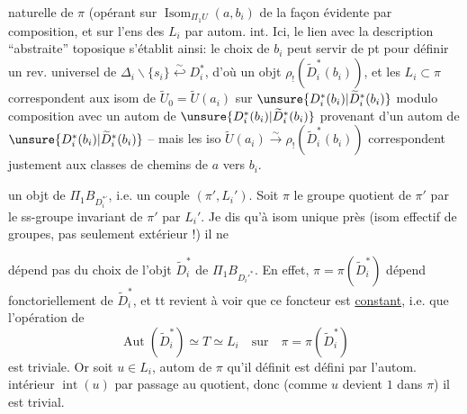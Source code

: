 naturelle de \(\pi\) (opérant sur \(\operatorname{Isom}_{\Pi_1U}(a,b_i)\) de la façon évidente par composition, et sur l'ens des \(L_i\) par autom. int.
 Ici, le  lien avec la description ``abstraite'' toposique s'établit ainsi: le choix de \(b_i\) peut servir de pt  pour définir un rev. universel de \(\Delta_i\smallsetminus\{s_i\}\overset{\sim}{\hookleftarrow}D_i^*\), d'où un objt \(\rho_!(\widetilde D_i^*(b_i))\), et  les \(L_i\subset\pi\) correspondent  aux isom de \(\widetilde U_0=\widetilde U(a_i)\) sur \(\unsure{D_i^*(b_i)|\widetilde D_i^*(b_i)}\) modulo composition avec un autom de \(\unsure{D_i^*(b_i)|\widetilde D_i^*(b_i)}\) provenant d'un autom de \(\unsure{D_i^*(b_i)|\widetilde D_i^*(b_i)}\) -- mais les iso  \(\widetilde U(a_i)\xrightarrow{\sim}\rho_!(\widetilde D_i^*(b_i))\) correspondent justement aux classes de chemins de \(a\) vers \(b_i\).

 un objt de \(\Pi_1B_{D_i^{*'}}\), i.e. un couple \((\pi',L_i')\). Soit \(\pi\) le groupe quotient de \(\pi'\) par le ss-groupe invariant de \(\pi'\)   par \(L_i'\). Je dis \margin{\(\Vert\)} qu'à isom unique près (isom effectif de groupes, pas seulement extérieur !) il ne

dépend pas du choix de l'objt \(\widetilde D_i^*\) de \(\Pi_1B_{D_i'^*}\). En effet, \(\pi=\pi(\widetilde D_i^*)\) dépend fonctoriellement de \(\widetilde D_i^*\), et tt revient à voir que ce foncteur est \uline{constant}, i.e. que l'opération de
\[
\operatorname{Aut}(\widetilde D_i^*)\simeq T\simeq L_i
\quad\text{sur}\quad
\pi=\pi(\widetilde D_i^*)
\]
est triviale. Or soit \(u\in L_i\),  autom de \(\pi\) qu'il définit est défini par l'autom. intérieur \(\operatorname{int}(u)\) par passage au quotient, donc (comme \(u\) devient \(1\) dans \(\pi\)) il est trivial. 

